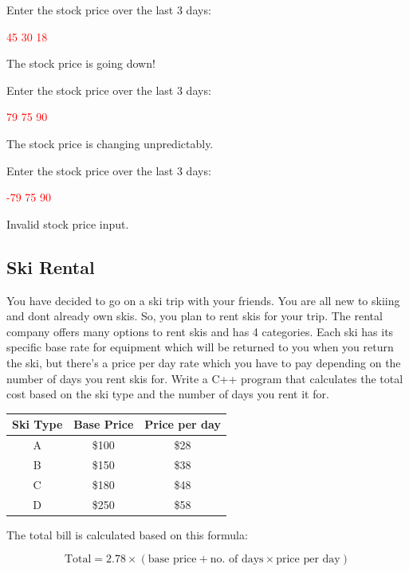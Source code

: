 \begin{sample}
Enter the stock price over the last 3 days:

\textcolor{red}{45 30 18}

The stock price is going down!
\end{sample}

\begin{sample}
Enter the stock price over the last 3 days:

\textcolor{red}{79 75 90}

The stock price is changing unpredictably.
\end{sample}

\begin{sample}
Enter the stock price over the last 3 days:

\textcolor{red}{-79 75 90}

Invalid stock price input.
\end{sample}


\subsection{Ski Rental}

You have decided to go on a ski trip with your friends. You are all new to skiing and dont already own skis. So, you plan to rent skis for your trip. The rental company offers many options to rent skis and has 4 categories. Each ski has its specific base rate for equipment which will be returned to you when you return the ski, but there's  a price per day rate which you have to pay depending on the number of days you rent skis for. Write a C++ program that calculates the total cost based on the ski type and the number of days you rent it for.\\


\begin{table}[H]
    \centering
    \begin{tabular}{c|c|c}
        Ski Type & Base Price & Price per day \\
        \hline
        A & \$100 & \$28 \\ 
        B & \$150 & \$38 \\ 
        C & \$180 & \$48 \\ 
        D & \$250 & \$58
    \end{tabular}
\end{table}

The total bill is calculated based on this formula:

\[
\text{Total} = 2.78 \times (\text{base price} + \text{no. of days} \times \text{price per day})
\]


